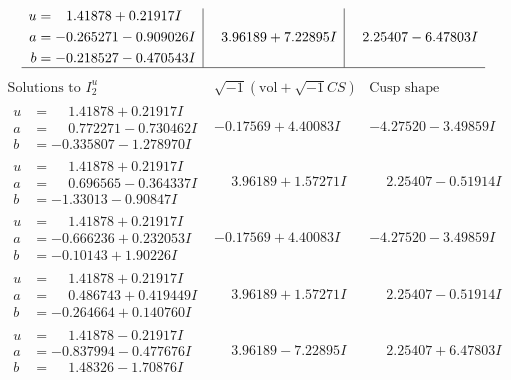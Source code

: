 \documentclass[1p]{elsarticle_modified}
\theoremstyle{definition}
\newcommand{\I}{\sqrt{-1}}
\begin{document}
$$\begin{array}{c|c|c}
\begin{aligned}
u &= \phantom{-}1.41878 + 0.21917 I \\
a &= -0.265271 - 0.909026 I \\
b &= -0.218527 - 0.470543 I\end{aligned}
 & \phantom{-}3.96189 + 7.22895 I & \phantom{-}2.25407 - 6.47803 I\\
 \hline 
 \end{array}$$\newpage$$\begin{array}{c|c|c}  
\text{Solutions to }I^u_{2}& \I (\text{vol} + \sqrt{-1}CS) & \text{Cusp shape}\\
 \hline 
\begin{aligned}
u &= \phantom{-}1.41878 + 0.21917 I \\
a &= \phantom{-}0.772271 - 0.730462 I \\
b &= -0.335807 - 1.278970 I\end{aligned}
 & -0.17569 + 4.40083 I & -4.27520 - 3.49859 I \\ \hline\begin{aligned}
u &= \phantom{-}1.41878 + 0.21917 I \\
a &= \phantom{-}0.696565 - 0.364337 I \\
b &= -1.33013 - 0.90847 I\end{aligned}
 & \phantom{-}3.96189 + 1.57271 I & \phantom{-}2.25407 - 0.51914 I \\ \hline\begin{aligned}
u &= \phantom{-}1.41878 + 0.21917 I \\
a &= -0.666236 + 0.232053 I \\
b &= -0.10143 + 1.90226 I\end{aligned}
 & -0.17569 + 4.40083 I & -4.27520 - 3.49859 I \\ \hline\begin{aligned}
u &= \phantom{-}1.41878 + 0.21917 I \\
a &= \phantom{-}0.486743 + 0.419449 I \\
b &= -0.264664 + 0.140760 I\end{aligned}
 & \phantom{-}3.96189 + 1.57271 I & \phantom{-}2.25407 - 0.51914 I \\ \hline\begin{aligned}
u &= \phantom{-}1.41878 - 0.21917 I \\
a &= -0.837994 - 0.477676 I \\
b &= \phantom{-}1.48326 - 1.70876 I\end{aligned}
 & \phantom{-}3.96189 - 7.22895 I & \phantom{-}2.25407 + 6.47803 I \\ \hline\begin{aligned}

\end{aligned}
\end{array}$$
\end{document}
